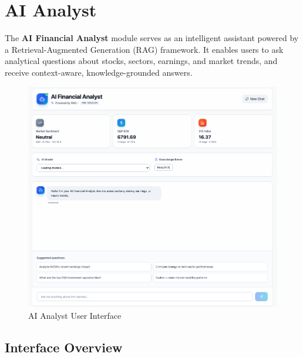 \section{AI Analyst}

The \textbf{AI Financial Analyst} module serves as an intelligent assistant powered by a Retrieval-Augmented Generation (RAG) framework. 
It enables users to ask analytical questions about stocks, sectors, earnings, and market trends, and receive context-aware, knowledge-grounded answers.
\begin{figure}[H]
    \centering
    \includegraphics[width=1\linewidth]{images/AI_Analyst_interface.png}
    \caption{AI Analyst User Interface}
    \label{fig:placeholder}
\end{figure}
\subsection{Interface Overview}

